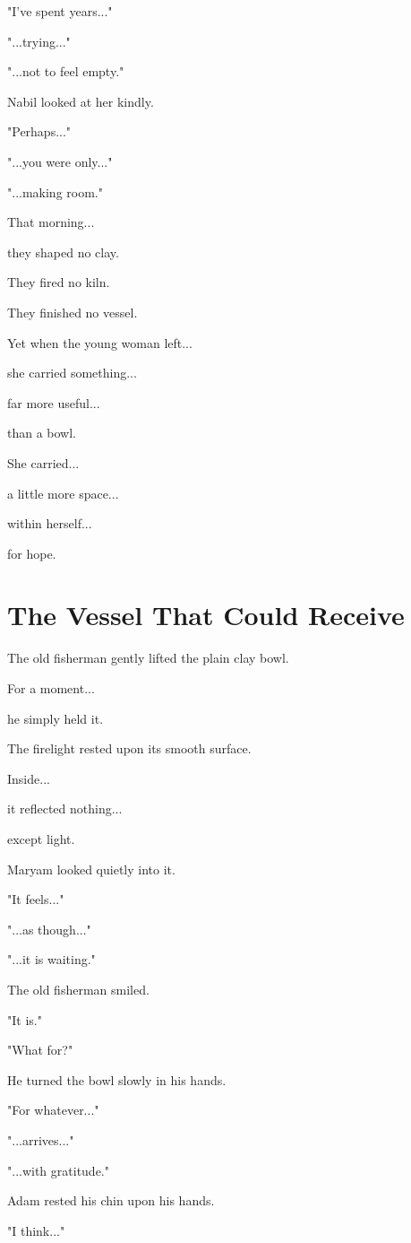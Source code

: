 \documentclass[12pt,openany]{book}
\begin{document}
"I've spent years..."

"...trying..."

"...not to feel empty."

Nabil looked at her kindly.

"Perhaps..."

"...you were only..."

"...making room."

That morning...

they shaped no clay.

They fired no kiln.

They finished no vessel.

Yet when the young woman left...

she carried something...

far more useful...

than a bowl.

She carried...

a little more space...

within herself...

for hope.
\section*{The Vessel That Could Receive}

The old fisherman gently lifted the plain clay bowl.

For a moment...

he simply held it.

The firelight rested upon its smooth surface.

Inside...

it reflected nothing...

except light.

Maryam looked quietly into it.

"It feels..."

"...as though..."

"...it is waiting."

The old fisherman smiled.

"It is."

"What for?"

He turned the bowl slowly in his hands.

"For whatever..."

"...arrives..."

"...with gratitude."

Adam rested his chin upon his hands.

"I think..."
\end{document}
